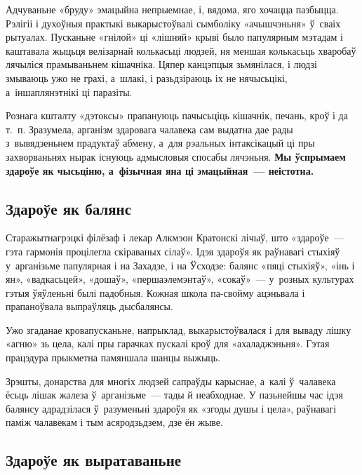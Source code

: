 Адчуваньне «бруду» эмацыйна непрыемнае, і, вядома, яго хочацца пазбыцца. Рэлігіі і духоўныя практыкі выкарыстоўвалі сымболіку «ачышчэньня» ў~сваіх рытуалах. Пусканьне «гнілой» ці «лішняй» крыві было папулярным мэтадам і каштавала жыцьця велізарнай колькасьці людзей, ня меншая колькасьць хваробаў лячыліся прамываньнем кішачніка. Цяпер канцэпцыя зьмянілася, і людзі змываюць ужо не грахі, а~шлакі, і разьдзіраюць іх не нячысьцікі, а~іншаплянэтнікі ці паразіты.

Рознага кшталту «дэтоксы» прапануюць пачысьціць кішачнік, печань, кроў і да т.~п. Зразумела, арганізм здаровага чалавека сам выдатна дае рады з~вывядзеньнем прадуктаў абмену, а~для рэальных інтаксікацый ці пры захворваньнях нырак існуюць адмысловыя спосабы лячэньня. \textbf{Мы ўспрымаем здароўе як чысьціню, а~фізычная яна ці эмацыйная~--- неістотна.}

\subsection*{Здароўе як балянс} 

Старажытнагрэцкі філёзаф і лекар Алкмэон Кратонскі лічыў, што «здароўе~--- гэта гармонія процілегла скіраваных сілаў». Ідэя здароўя як раўнавагі стыхіяў у~арганізьме папулярная і на Захадзе, і на Ўсходзе: балянс «пяці стыхіяў», «інь і ян», «вадкасьцей», «дошаў», «першаэлемэнтаў», «сокаў»~--- у~розных культурах гэтыя ўяўленьні былі падобныя. Кожная школа па-свойму ацэньвала і прапаноўвала выпраўляць дысбалянсы.

Ужо згаданае кровапусканьне, напрыклад, выкарыстоўвалася і для вываду лішку «агню» зь цела, калі пры гарачках пускалі кроў для «ахаладжэньня». Гэтая працэдура прыкметна памяншала шанцы выжыць. 


Зрэшты, донарства для многіх людзей сапраўды карыснае, а~калі ў~чалавека ёсьць лішак жалеза ў~арганізьме~--- тады й неабходнае. У пазьнейшы час ідэя балянсу адрадзілася ў~разуменьні здароўя як «згоды душы і цела», раўнавагі паміж чалавекам і тым асяродзьдзем, дзе ён жыве.

\subsection*{Здароўе як выратаваньне} 

